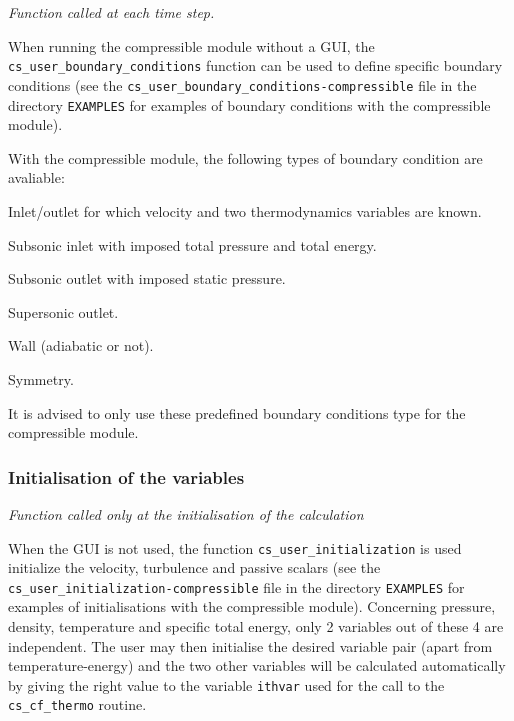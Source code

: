 \noindent
\textit{Function called at each time step.}

When running the compressible module without a GUI, the \texttt{cs\_user\_boundary\_conditions} function can be used to define specific boundary conditions
(see the \texttt{cs\_user\_boundary\_conditions-compressible} file in the directory \texttt{EXAMPLES}
for examples of boundary conditions with the compressible module).

With the compressible module, the following types of boundary condition are avaliable:

\begin{list}{-}{}
  \item Inlet/outlet for which velocity and two thermodynamics variables are known.
  \item Subsonic inlet with imposed total pressure and total energy.
  \item Subsonic outlet with imposed static pressure.
  \item Supersonic outlet.
  \item Wall (adiabatic or not).
  \item Symmetry.
\end{list}

It is advised to only use these predefined boundary conditions type for the compressible module.

\subsubsection{Initialisation of the variables}

\noindent
\textit{Function called only at the initialisation of the calculation}

When the GUI is not used, the function \texttt{cs\_user\_initialization} is used
initialize the velocity, turbulence and passive scalars (see
the \texttt{cs\_user\_initialization-compressible} file in the directory \texttt{EXAMPLES}
for examples of initialisations with the compressible module). Concerning
pressure, density, temperature and specific total energy, only 2 variables out
of these 4 are independent. The user may then initialise the desired variable pair
(apart from temperature-energy) and the two other variables will be
calculated automatically by giving the right value to the variable
\texttt{ithvar} used for the call to the \texttt{cs\_cf\_thermo} routine.

